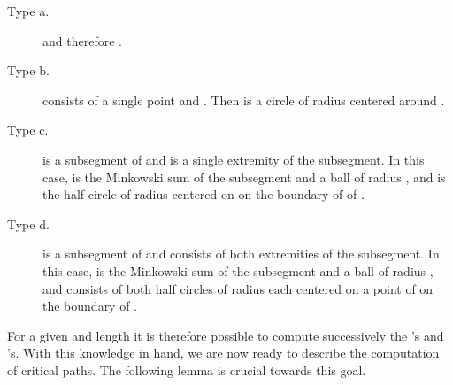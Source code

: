 \begin{description}
  \item[Type a.]  and therefore .
  \item[Type b.]  consists of a single point  and . Then  is a circle of
    radius  centered around .
  \item[Type c.]  is a subsegment of  and
     is a single extremity of the subsegment. In
    this case,  is the Minkowski sum of the subsegment and a ball
    of radius , and  is the half circle of radius  centered
    on  on the boundary of of .
   \item[Type d.]  is a subsegment of  and
     consists of both extremities of the
    subsegment. In this case,  is the Minkowski sum of the
    subsegment and a ball of radius , and  consists of both
    half circles of radius  each centered on a point of
     on the boundary of .
\end{description}

\noindent For a given  and length  it is
therefore possible to compute successively the 's and 's. With this knowledge in hand, we are now ready to describe the computation of critical paths. The following lemma is crucial towards this goal.

